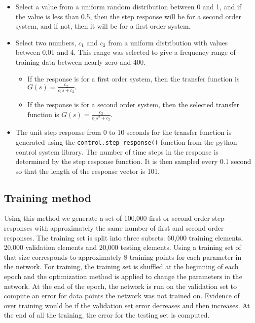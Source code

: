   \begin{itemize}

    \item Select a value from a uniform random distribution between 0 and 1, and
    if the value is less than 0.5, then the step response will be for a second
    order system, and if not, then it will be for a first order system.

    \item Select two numbers, $c_1$ and $c_2$ from a uniform distribution with
    values between 0.01 and 4. This range was selected to give a frequency range
    of training data between nearly zero and 400.

    \begin{itemize}

      \item If the response is for a first order system, then the transfer
      function is $G(s) = \frac{c_2}{c_1 s + c_2}.$
      \item If the response is for a second order system, then the selected
      transfer function is
      $G(s) = \frac{c_2}{c_1 s^2 + c_2}.$

    \end{itemize}

	\item The unit step response from 0 to 10 seconds for the transfer function
	  is generated using the \texttt{control.step\_response()} function from the
	  python control system library. The number of time steps in the response is
	  determined by the step response function. It is then sampled every 0.1
	  second so that the length of the response vector is 101.

\end{itemize} 

\subsection{Training method}

    Using this method we generate a set of 100,000 first or second order step
    responses with approximately the same number of first and second order
    responses. The training set is split into three subsets: 60,000 training
    elements, 20,000 validation elements and 20,000 testing elements. Using a
    training set of that size corresponds to approximately 8 training points for
    each parameter in the network. For training, the training set is shuffled at
    the beginning of each epoch and the optimization method is applied to change
    the parameters in the network.  At the end of the epoch, the network is run
    on the validation set to compute an error for data points the network was
    not trained on. Evidence of over training would be if the validation set
    error decreases and then increases.  At the end of all the training, the
    error for the testing set is computed.


